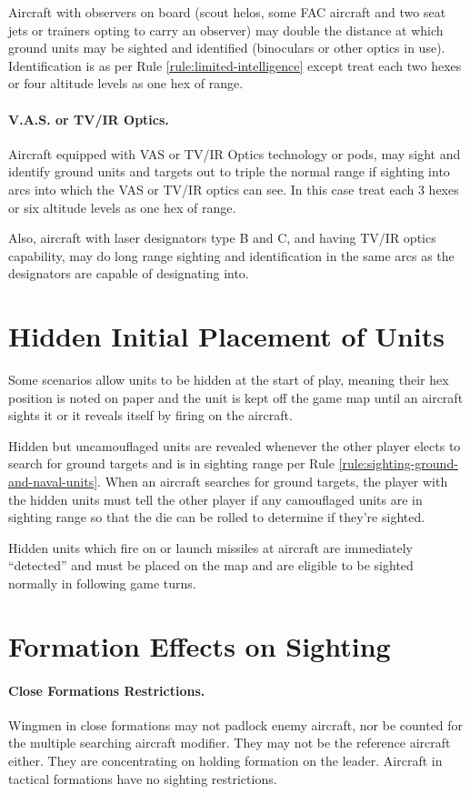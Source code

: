 \begin{advancedrules}
Aircraft with observers on board (scout helos, some FAC aircraft and two seat jets or trainers opting to carry an observer) may double the distance at which ground units may be sighted and identified (binoculars or other optics in use).  Identification is as per Rule \ref{rule:limited-intelligence} except treat each two hexes or four altitude levels as one hex of range.

\paragraph{V.A.S. or TV/IR Optics.} Aircraft equipped with VAS or TV/IR Optics technology or pods, may sight and identify ground units and targets out to triple the normal range if sighting into arcs into which the VAS or TV/IR optics can see. In this case treat each 3 hexes or six altitude levels as one hex of range.

Also, aircraft with laser designators type B and C, and having TV/IR optics capability, may do long range sighting and identification in the same arcs as the designators are capable of designating into.

\section{Hidden Initial Placement of Units}

Some scenarios allow units to be hidden at the start of play, meaning their hex position is noted on paper and the unit is kept off the game map until an aircraft sights it or it reveals itself by firing on the aircraft.

Hidden but uncamouflaged units are revealed whenever the other player elects to search for ground targets and is in sighting range per Rule \ref{rule:sighting-ground-and-naval-units}. When an aircraft searches for ground targets, the player with the hidden units must tell the other player if any camouflaged units are in sighting range so that the die can be rolled to determine if they're sighted.

Hidden units which fire on or launch missiles at aircraft are immediately “detected” and must be placed on the map and are eligible to be sighted normally in following game turns.

\section{Formation Effects on Sighting}

\paragraph{Close Formations Restrictions.} Wingmen in close formations may not padlock enemy aircraft, nor be counted for the multiple searching aircraft modifier. They may not be the reference aircraft either. They are concentrating on holding formation on the leader. Aircraft in tactical formations have no sighting restrictions.


\end{advancedrules}
